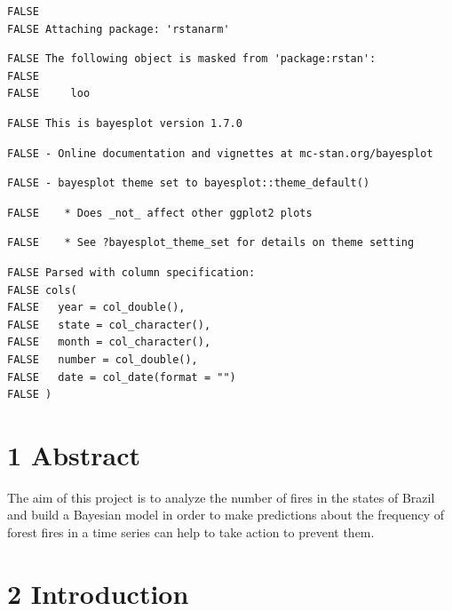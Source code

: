 \documentclass[]{article}
\begin{document}
\begin{verbatim}
FALSE 
FALSE Attaching package: 'rstanarm'
\end{verbatim}

\begin{verbatim}
FALSE The following object is masked from 'package:rstan':
FALSE 
FALSE     loo
\end{verbatim}

\begin{verbatim}
FALSE This is bayesplot version 1.7.0
\end{verbatim}

\begin{verbatim}
FALSE - Online documentation and vignettes at mc-stan.org/bayesplot
\end{verbatim}

\begin{verbatim}
FALSE - bayesplot theme set to bayesplot::theme_default()
\end{verbatim}

\begin{verbatim}
FALSE    * Does _not_ affect other ggplot2 plots
\end{verbatim}

\begin{verbatim}
FALSE    * See ?bayesplot_theme_set for details on theme setting
\end{verbatim}

\begin{verbatim}
FALSE Parsed with column specification:
FALSE cols(
FALSE   year = col_double(),
FALSE   state = col_character(),
FALSE   month = col_character(),
FALSE   number = col_double(),
FALSE   date = col_date(format = "")
FALSE )
\end{verbatim}

\section{1 Abstract}\label{abstract}

The aim of this project is to analyze the number of fires in the states
of Brazil and build a Bayesian model in order to make predictions about
the frequency of forest fires in a time series can help to take action
to prevent them.

\section{2 Introduction}\label{introduction}
\end{document}
